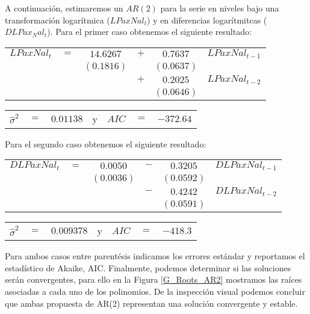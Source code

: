 \documentclass[
  a4paper,
]{article}
\begin{document}
A continuación, estimaremos un \(AR(2)\) para la serie en niveles bajo
una transformación logarítmica (\(LPaxNal_t\)) y en diferencias
logarítmitcas (\(DLPax_Nal_t\)). Para el primer caso obtenemos el
siguiente resultado:

\begin{center}
\begin{tabular}{ c c c c c c } 
    $LPaxNal_t$ & $=$ & $14.6267$ & $+$ & $0.7637$  & $LPaxNal_{t-1}$ \\ 
    &  & $(0.1816)$ &  & $(0.0637)$ & \\
    &  &  & $+$ & $0.2025$ & $LPaxNal_{t-2}$ \\
    &  &  &  & $(0.0646)$ &
\end{tabular}
\end{center}

\begin{center}
\begin{tabular}{ c c c c c c c } 
    $\hat{\sigma}^2$ & $=$ & $0.01138$ & y & $AIC$ & $=$ & $-372.64$ 
\end{tabular}
\end{center}

Para el segundo caso obtenemos el siguiente resultado:

\begin{center}
\begin{tabular}{ c c c c c c } 
    $DLPaxNal_t$ & $=$ & $0.0050$ & $-$ & $0.3205$  & $DLPaxNal_{t-1}$ \\ 
    &  & $(0.0036)$ &  & $(0.0592)$ & \\
    &  &  & $-$ & $0.4242$ & $DLPaxNal_{t-2}$ \\
    &  &  &  & $(0.0591)$ &
\end{tabular}
\end{center}

\begin{center}
\begin{tabular}{ c c c c c c c } 
    $\hat{\sigma}^2$ & $=$ & $0.009378$ & y & $AIC$ & $=$ & $-418.3$ 
\end{tabular}
\end{center}

Para ambos casos entre parentésis indicamos los errores estándar y
reportamos el estadístico de Akaike, AIC. Finalmente, podemos determinar
si las soluciones serán convergentes, para ello en la Figura
\ref{G_Roots_AR2} mostramos las raíces asociadas a cada uno de los
polinomios. De la inspección visual podemos concluir que ambas propuesta
de AR(2) representan una solución convergente y estable.
\end{document}
